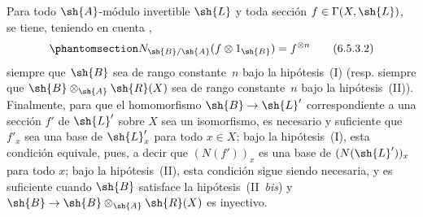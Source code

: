 \documentclass[oneside,10pt]{amsart}
\makeatletter
\newcommand{\ega@arrow}[2]{\mathchoice{#1}{#2}{#2}{#2}}
\renewcommand{\to}{\ega@arrow{\longrightarrow}{\rightarrow}}
\let\EGAOriginalLabel\label
\renewcommand{\label}[1]{\phantomsection\EGAOriginalLabel{#1}}
\makeatother
\begin{document}
\begin{env}[6.5.3]
Para todo $\sh{A}$-módulo invertible $\sh{L}$ y toda sección $f\in\Gamma(X,\sh{L})$, se tiene, teniendo en cuenta ,
\[
\label{II.6.5.3.2}
  N_{\sh{B}/\sh{A}}(f\otimes 1_{\sh{B}}) = f^{\otimes n}
\tag{6.5.3.2}
\]
siempre que $\sh{B}$ sea de rango constante~$n$ bajo la hipótesis~(I) (resp. siempre que $\sh{B}\otimes_{\sh{A}}\sh{R}(X)$ sea de rango constante~$n$ bajo la hipótesis~(II)).
Finalmente, para que el homomorfismo $\sh{B}\to\sh{L}'$ correspondiente a una sección $f'$ de $\sh{L}'$ sobre $X$ sea un isomorfismo, es necesario y suficiente que $f'_x$ sea una base de $\sh{L}'_x$ para todo $x\in X$;
bajo la hipótesis~(I), esta condición equivale, pues, a decir que $(N(f'))_x$ es una base de $(N(\sh{L}'))_x$ para todo $x$;
bajo la hipótesis~(II), esta condición sigue siendo necesaria, y es suficiente cuando $\sh{B}$ satisface la hipótesis~(II~\emph{bis}) y $\sh{B}\to\sh{B}\otimes_{\sh{A}}\sh{R}(X)$ es inyectivo.
\end{env}
\end{document}
